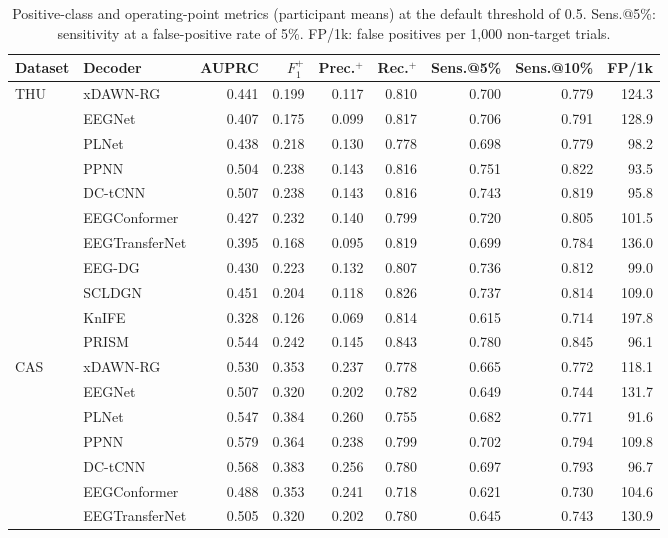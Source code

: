 \begin{table}[H]
\centering
\caption{Positive-class and operating-point metrics (participant means) at the default threshold of 0.5. Sens.@5\%: sensitivity at a false-positive rate of 5\%. FP/1k: false positives per 1{,}000 non-target trials.}
\label{tab:supp-positive}
\footnotesize
\begin{adjustbox}{max width=\textwidth}
\begin{tabular}{@{}llrrrrrrr@{}}
\toprule
Dataset & Decoder & AUPRC & $F_1^+$ & Prec.$^+$ & Rec.$^+$ & Sens.@5\% & Sens.@10\% & FP/1k \\
\midrule
\multirow{11}{*}{THU} & xDAWN-RG & 0.441 & 0.199 & 0.117 & 0.810 & 0.700 & 0.779 & 124.3 \\
 & EEGNet & 0.407 & 0.175 & 0.099 & 0.817 & 0.706 & 0.791 & 128.9 \\
 & PLNet & 0.438 & 0.218 & 0.130 & 0.778 & 0.698 & 0.779 & 98.2 \\
 & PPNN & 0.504 & 0.238 & 0.143 & 0.816 & 0.751 & 0.822 & 93.5 \\
 & DC-tCNN & 0.507 & 0.238 & 0.143 & 0.816 & 0.743 & 0.819 & 95.8 \\
 & EEGConformer & 0.427 & 0.232 & 0.140 & 0.799 & 0.720 & 0.805 & 101.5 \\
 & EEGTransferNet & 0.395 & 0.168 & 0.095 & 0.819 & 0.699 & 0.784 & 136.0 \\
 & EEG-DG & 0.430 & 0.223 & 0.132 & 0.807 & 0.736 & 0.812 & 99.0 \\
 & SCLDGN & 0.451 & 0.204 & 0.118 & 0.826 & 0.737 & 0.814 & 109.0 \\
 & KnIFE & 0.328 & 0.126 & 0.069 & 0.814 & 0.615 & 0.714 & 197.8 \\
 & PRISM & 0.544 & 0.242 & 0.145 & 0.843 & 0.780 & 0.845 & 96.1 \\
\midrule
\multirow{11}{*}{CAS} & xDAWN-RG & 0.530 & 0.353 & 0.237 & 0.778 & 0.665 & 0.772 & 118.1 \\
 & EEGNet & 0.507 & 0.320 & 0.202 & 0.782 & 0.649 & 0.744 & 131.7 \\
 & PLNet & 0.547 & 0.384 & 0.260 & 0.755 & 0.682 & 0.771 & 91.6 \\
 & PPNN & 0.579 & 0.364 & 0.238 & 0.799 & 0.702 & 0.794 & 109.8 \\
 & DC-tCNN & 0.568 & 0.383 & 0.256 & 0.780 & 0.697 & 0.793 & 96.7 \\
 & EEGConformer & 0.488 & 0.353 & 0.241 & 0.718 & 0.621 & 0.730 & 104.6 \\
 & EEGTransferNet & 0.505 & 0.320 & 0.202 & 0.780 & 0.645 & 0.743 & 130.9 \\

\end{tabular}
\end{adjustbox}
\end{table}
